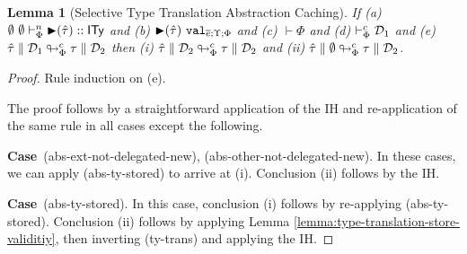 \documentclass[12pt]{article}
\newtheorem{lemma}{Lemma}
\newcommand{\pfcase}[1]{\textbf{Case}~#1. }
\begin{document}
\begin{lemma}[Selective Type Translation Abstraction Caching]
\label{lemma:type-translation-stores-are-idempotent}
If (a) $\sofkVX{\sqity{\qity}}{\kity}$ and (b) $\sval{\sqity{\qity}}{\es;\Upsilon;\Phi}$ and (c) $\vdash \Phi$ and (d) $\tytsvX{\memD_1}$ and (e) $\tdeabs{\Phi}{c}{\qity}{\memD_1}{\ity}{\memD_2}$ then (i) $\tdeabs{\Phi}{c}{\qity}{\memD_2}{\ity}{\memD_2}$ and (ii) $\tdeabs{\Phi}{c}{\qity}{\emptyset}{\ity}{\memD_2}$.
\end{lemma}
\begin{proof} Rule induction on (e).

The proof follows by a straightforward application of the IH and re-application of the same rule in all cases except the following.

\pfcase{(abs-ext-not-delegated-new), (abs-other-not-delegated-new)} In these cases, we can apply (abs-ty-stored) to arrive at (i). Conclusion (ii) follows by the IH.

\pfcase{(abs-ty-stored)} In this case, conclusion (i) follows by re-applying (abs-ty-stored). Conclusion (ii) follows by applying Lemma \ref{lemma:type-translation-store-validitiy}, then inverting (ty-trans) and applying the IH. 
\end{proof}
\end{document}
